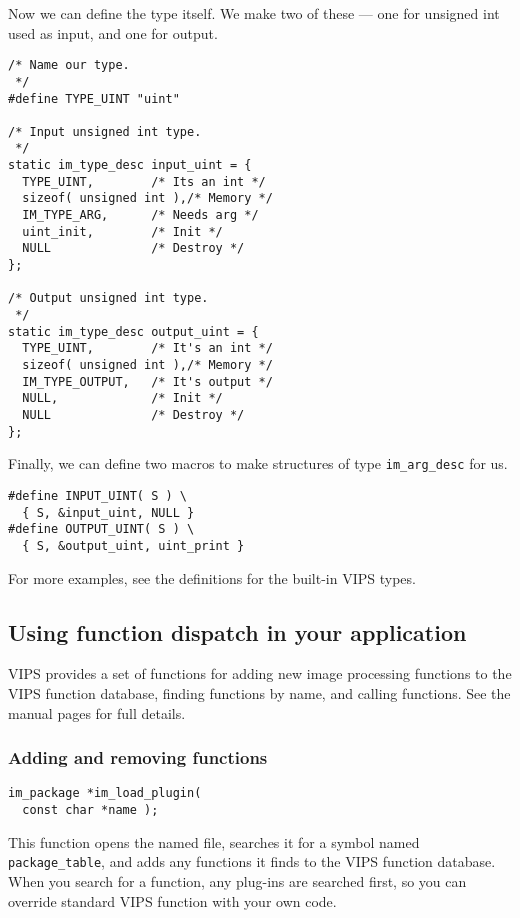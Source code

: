 Now we can define the type itself. We make two of these --- one for unsigned
int used as input, and one for output.

\begin{verbatim}
/* Name our type.
 */
#define TYPE_UINT "uint"

/* Input unsigned int type.
 */
static im_type_desc input_uint = {
  TYPE_UINT,        /* Its an int */
  sizeof( unsigned int ),/* Memory */
  IM_TYPE_ARG,      /* Needs arg */
  uint_init,        /* Init */
  NULL              /* Destroy */
};

/* Output unsigned int type.
 */
static im_type_desc output_uint = {
  TYPE_UINT,        /* It's an int */
  sizeof( unsigned int ),/* Memory */
  IM_TYPE_OUTPUT,   /* It's output */
  NULL,             /* Init */
  NULL              /* Destroy */
};
\end{verbatim}

Finally, we can define two macros to make structures of type
\verb+im_arg_desc+ for us.

\begin{verbatim}
#define INPUT_UINT( S ) \
  { S, &input_uint, NULL }
#define OUTPUT_UINT( S ) \
  { S, &output_uint, uint_print }
\end{verbatim}

For more examples, see the definitions for the built-in VIPS types.

\subsection{Using function dispatch in your application}

VIPS provides a set of functions for adding new image processing functions
to the VIPS function database, finding functions by name, and calling
functions. See the manual pages for full details.

\subsubsection{Adding and removing functions}

\begin{verbatim}
im_package *im_load_plugin( 
  const char *name );
\end{verbatim}

This function opens the named file, searches it for a symbol named 
\verb+package_table+, and adds any functions it finds to the VIPS function
database. When you search for a function, any plug-ins are searched first,
so you can override standard VIPS function with your own code.

